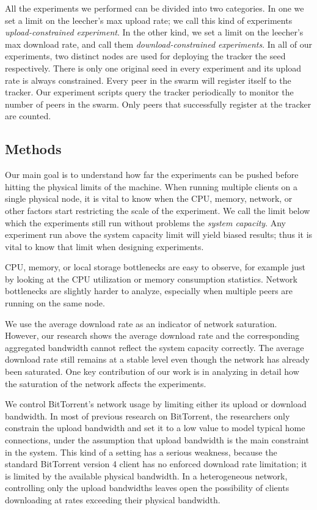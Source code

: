 \documentclass[10pt,letterpaper,twocolumn]{article}
\begin{document}
All the experiments we performed can be divided into two categories.
In one we set a limit on the leecher's max upload rate; we call this
kind of experiments \textit{upload-constrained experiment}. In the
other kind, we set a limit on the leecher's max download rate, and
call them \textit{download-constrained experiments}. In all of our
experiments, two distinct nodes are used for deploying the tracker the
seed respectively. There is only one original seed in every experiment
and its upload rate is always constrained. Every peer in the swarm
will register itself to the tracker. Our experiment scripts query the
tracker periodically to monitor the number of peers in the swarm.
Only peers that successfully register at the tracker are counted.



\subsection{Methods}
\label{sec:methods}

Our main goal is to understand how far the experiments can be pushed
before hitting the physical limits of the machine. When running
multiple clients on a single physical node, it is vital to know when
the CPU, memory, network, or other factors start restricting the scale
of the experiment. We call the limit below which the experiments still
run without problems the \textit{system capacity}. Any experiment run
above the system capacity limit will yield biased results; thus it is
vital to know that limit when designing experiments.

CPU, memory, or local storage bottlenecks are easy to observe, for
example just by looking at the CPU utilization or memory consumption
statistics. Network bottlenecks are slightly harder to analyze,
especially when multiple peers are running on the same node.

We use the average download rate as an indicator of network
saturation. However, our research shows the average download rate and
the corresponding aggregated bandwidth cannot reflect the system
capacity correctly. The average download rate still remains at a
stable level even though the network has already been saturated. One
key contribution of our work is in analyzing in detail how the
saturation of the network affects the experiments.





We control BitTorrent's network usage by limiting either its upload or
download bandwidth. In most of previous research on BitTorrent, the
researchers only constrain the upload bandwidth and set it to a low
value to model typical home connections, under the assumption that
upload bandwidth is the main constraint in the system. This kind of a
setting has a serious weakness, because the standard BitTorrent
version 4 client has no enforced download rate limitation; it is
limited by the available physical bandwidth. In a heterogeneous
network, controlling only the upload bandwidths leaves open the
possibility of clients downloading at rates exceeding their physical
bandwidth.
\end{document}
